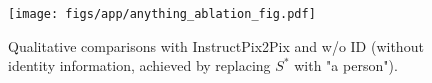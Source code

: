 \begin{figure}[htb]
  \centering
  \texttt{[image: figs/app/anything\_ablation\_fig.pdf]}
  \caption{Qualitative comparisons with InstructPix2Pix and w/o ID (without identity information, achieved by replacing $S^{*}$ with "a person"). }
  \label{fig:anything_ablation}
\end{figure}